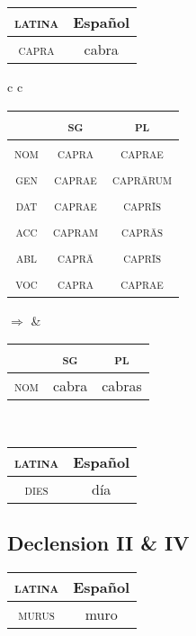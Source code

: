 \documentclass{report}
\begin{document}
\begin{tabular}{|c|c|}
  \hline
  \textsc{latina} & Español \\
  \hline
  \textsc{capra} & cabra \\
  \hline
\end{tabular}

\begin{tabular}{c c}
  \begin{tabular}{|c|c|c|}
    \hline
    & \textsc{sg} & \textsc{pl} \\
    \hline
    \textsc{nom} & \textsc{capra }& \textsc{caprae} \\
    \hline
    \textsc{gen} & \textsc{caprae} & \textsc{capr\={a}rum} \\
    \hline
    \textsc{dat} & \textsc{caprae} & \textsc{capr\={i}s} \\
    \hline
    \textsc{acc} & \cellcolor{gray} \textsc{capram} & \cellcolor{magenta} \textsc{capr\={a}s} \\
    \hline
    \textsc{abl} & \textsc{capr\={a}} & \textsc{capr\={i}s} \\
    \hline
    \textsc{voc} & \textsc{capra} & \textsc{caprae} \\
    \hline
  \end{tabular} \quad $\Rightarrow$ &

  \begin{tabular}{|c|c|c|}
    \hline
    & \textsc{sg} & \textsc{pl} \\
    \hline
    \textsc{nom} & \cellcolor{gray} cabra & \cellcolor{magenta} cabras \\
    \hline
  \end{tabular} \\
\end{tabular}

\begin{tabular}{|c|c|}
  \hline
  \textsc{latina} & Español \\
  \hline
  \textsc{dies} & día \\
  \hline
\end{tabular}

\subsection{Declension II \& IV}

\begin{tabular}{|c|c|}
  \hline
  \textsc{latina} & Español \\
  \hline
  \textsc{murus} & muro \\
  \hline
\end{tabular}
\end{document}
